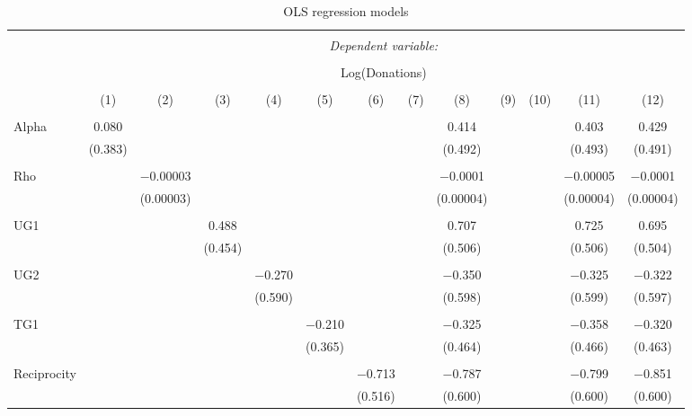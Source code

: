 \documentclass[12pt]{article}
\begin{document}
\begin{table}[!htbp] \centering 
{\color{blue}
  \caption{OLS regression models} 
  \label{} 
   \begin{adjustbox}{width=\textwidth}
\begin{tabular}{@{\extracolsep{5pt}}lcccccccccccc} 
\\[-1.8ex]\hline 
\hline \\[-1.8ex] 
 & \multicolumn{12}{c}{\textit{Dependent variable:}} \\ 
\cline{2-13} 
\\[-1.8ex] & \multicolumn{12}{c}{Log(Donations)} \\ 
\\[-1.8ex] & (1) & (2) & (3) & (4) & (5) & (6) & (7) & (8) & (9) & (10) & (11) & (12)\\ 
\hline \\[-1.8ex] 
 Alpha & 0.080 &  &  &  &  &  &  & 0.414 &  &  & 0.403 & 0.429 \\ 
  & (0.383) &  &  &  &  &  &  & (0.492) &  &  & (0.493) & (0.491) \\ 
  & & & & & & & & & & & & \\ 
 Rho &  & $-$0.00003 &  &  &  &  &  & $-$0.0001 &  &  & $-$0.00005 & $-$0.0001 \\ 
  &  & (0.00003) &  &  &  &  &  & (0.00004) &  &  & (0.00004) & (0.00004) \\ 
  & & & & & & & & & & & & \\ 
 UG1 &  &  & 0.488 &  &  &  &  & 0.707 &  &  & 0.725 & 0.695 \\ 
  &  &  & (0.454) &  &  &  &  & (0.506) &  &  & (0.506) & (0.504) \\ 
  & & & & & & & & & & & & \\ 
 UG2 &  &  &  & $-$0.270 &  &  &  & $-$0.350 &  &  & $-$0.325 & $-$0.322 \\ 
  &  &  &  & (0.590) &  &  &  & (0.598) &  &  & (0.599) & (0.597) \\ 
  & & & & & & & & & & & & \\ 
 TG1 &  &  &  &  & $-$0.210 &  &  & $-$0.325 &  &  & $-$0.358 & $-$0.320 \\ 
  &  &  &  &  & (0.365) &  &  & (0.464) &  &  & (0.466) & (0.463) \\ 
  & & & & & & & & & & & & \\ 
 Reciprocity &  &  &  &  &  & $-$0.713 &  & $-$0.787 &  &  & $-$0.799 & $-$0.851 \\ 
  &  &  &  &  &  & (0.516) &  & (0.600) &  &  & (0.600) & (0.600) \\ 

\end{tabular}
\end{adjustbox}}
\end{table}
\end{document}
